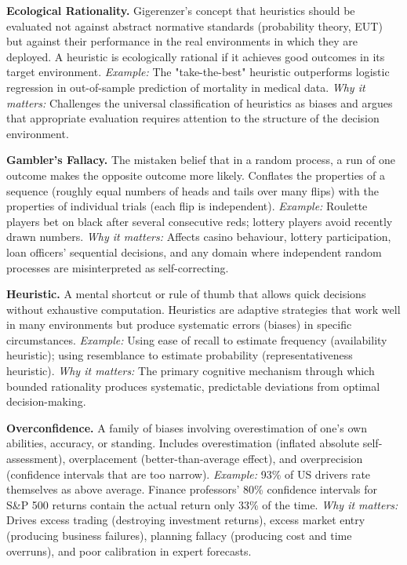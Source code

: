 \documentclass[12pt, letterpaper]{article}
\begin{document}
\textbf{Ecological Rationality.} Gigerenzer's concept that heuristics should be evaluated not against abstract normative standards (probability theory, EUT) but against their performance in the real environments in which they are deployed. A heuristic is ecologically rational if it achieves good outcomes in its target environment. \textit{Example:} The "take-the-best" heuristic outperforms logistic regression in out-of-sample prediction of mortality in medical data. \textit{Why it matters:} Challenges the universal classification of heuristics as biases and argues that appropriate evaluation requires attention to the structure of the decision environment.

\textbf{Gambler's Fallacy.} The mistaken belief that in a random process, a run of one outcome makes the opposite outcome more likely. Conflates the properties of a sequence (roughly equal numbers of heads and tails over many flips) with the properties of individual trials (each flip is independent). \textit{Example:} Roulette players bet on black after several consecutive reds; lottery players avoid recently drawn numbers. \textit{Why it matters:} Affects casino behaviour, lottery participation, loan officers' sequential decisions, and any domain where independent random processes are misinterpreted as self-correcting.

\textbf{Heuristic.} A mental shortcut or rule of thumb that allows quick decisions without exhaustive computation. Heuristics are adaptive strategies that work well in many environments but produce systematic errors (biases) in specific circumstances. \textit{Example:} Using ease of recall to estimate frequency (availability heuristic); using resemblance to estimate probability (representativeness heuristic). \textit{Why it matters:} The primary cognitive mechanism through which bounded rationality produces systematic, predictable deviations from optimal decision-making.

\textbf{Overconfidence.} A family of biases involving overestimation of one's own abilities, accuracy, or standing. Includes overestimation (inflated absolute self-assessment), overplacement (better-than-average effect), and overprecision (confidence intervals that are too narrow). \textit{Example:} 93\% of US drivers rate themselves as above average. Finance professors' 80\% confidence intervals for S\&P 500 returns contain the actual return only 33\% of the time. \textit{Why it matters:} Drives excess trading (destroying investment returns), excess market entry (producing business failures), planning fallacy (producing cost and time overruns), and poor calibration in expert forecasts.
\end{document}
